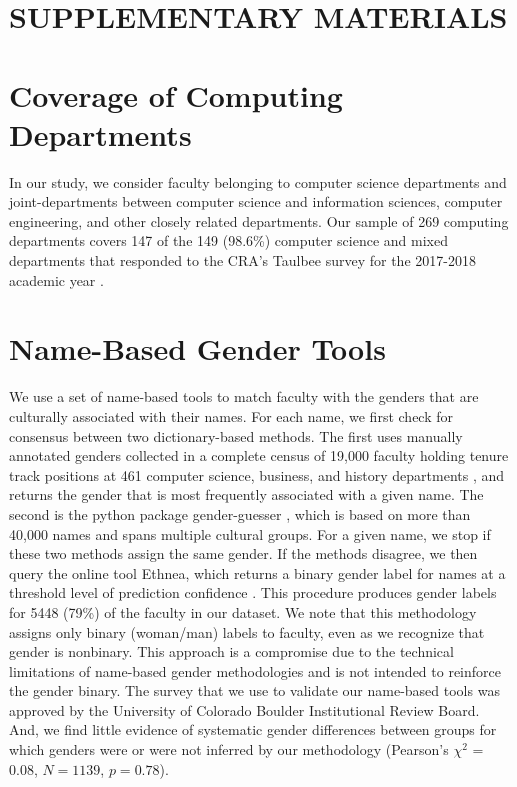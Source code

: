 \documentclass[reprint, twocolumn, aps, nofootinbib, superscriptaddress, longbibliography]{revtex4-1}
\begin{document}
 


\section*{SUPPLEMENTARY MATERIALS} 
\renewcommand{\thefigure}{S\arabic{figure}}
\setcounter{figure}{0}
\renewcommand{\thetable}{S\arabic{table}}
\setcounter{table}{0}



\section{Coverage of Computing Departments}\label{sec:department_coverage} 
In our study, we consider faculty belonging to computer science departments and joint-departments between computer science and information sciences, computer engineering, and other closely related departments. Our sample of 269 computing departments covers 147 of the 149 (98.6\%) computer science and mixed departments that responded to the CRA's Taulbee survey for the 2017-2018 academic year \cite{computing2017taulbee}. 

\section{Name-Based Gender Tools} \label{sec:name_based_tools} 
We use a set of name-based tools to match faculty with the genders that are culturally associated with their names. For each name, we first check for consensus between two dictionary-based methods. The first uses manually annotated genders collected in a complete census of 19,000 faculty holding tenure track positions at 461 computer science, business, and history departments \cite{clauset2015systematic}, and returns the gender that is most frequently associated with a given name. The second is the python package gender-guesser \cite{genderguesser2016}, which is based on more than 40,000 names and spans multiple cultural groups. For a given name, we stop if these two methods assign the same gender. If the methods disagree, we then query the online tool Ethnea, which returns a binary gender label for names at a threshold level of prediction confidence \cite{smith2013search}. This procedure produces gender labels for 5448 (79\%) of the faculty in our dataset. We note that this methodology assigns only binary (woman/man) labels to faculty, even as we recognize that gender is nonbinary. This approach is a compromise due to the technical limitations of name-based gender methodologies and is not intended to reinforce the gender binary. The survey that we use to validate our name-based tools was approved by the University of Colorado Boulder Institutional Review Board. And, we find little evidence of systematic gender differences between groups for which genders were or were not inferred by our methodology (Pearson’s $\chi^2$ = 0.08, $N = 1139$, $p = 0.78$). 
\end{document}
